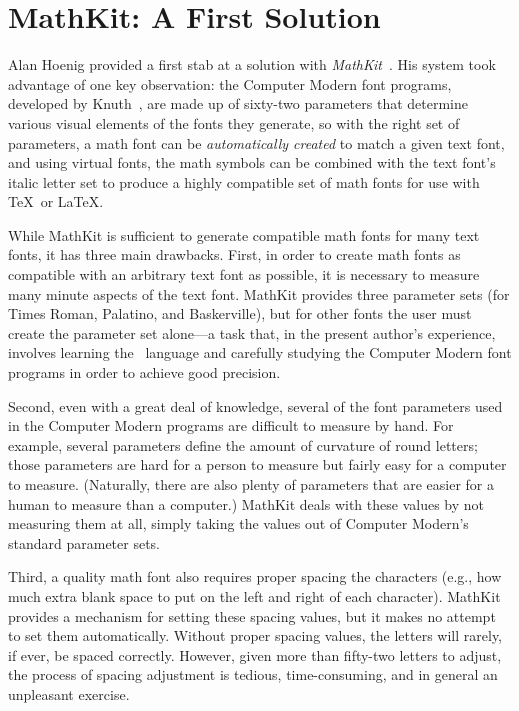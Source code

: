 \documentclass[preprint]{ltugproc}
\begin{document}
\section{MathKit: A First Solution}

Alan Hoenig provided a first stab at a solution with
\emph{MathKit}~\cite{mathkit}. His system took advantage of one key observation:
the Computer Modern font programs, developed by Knuth~\cite{cte}, are
made up of sixty-two parameters that determine various visual elements of the
fonts they generate, so with the right set of parameters, a math font can be
\emph{automatically created} to match a given text font, and using virtual
fonts, the math symbols can be combined with the text font's italic letter set
to produce a highly compatible set of math fonts for use with \TeX\ or \LaTeX.

While MathKit is sufficient to generate compatible math fonts for many text
fonts, it has three main drawbacks. First, in order to create math fonts as
compatible with an arbitrary text font as possible, it is necessary to measure
many minute aspects of the text font. MathKit provides three parameter sets (for
Times Roman, Palatino, and Baskerville), but for other fonts the user must
create the parameter set alone---a task that, in the present author's
experience, involves learning the \MF\ language and carefully studying the
Computer Modern font programs in order to achieve good precision.

Second, even with a great deal of knowledge, several of the font parameters used
in the Computer Modern programs are difficult to measure by hand. For example,
several parameters define the amount of curvature of round letters; those
parameters are hard for a person to measure but fairly easy for a computer to
measure. (Naturally, there are also plenty of parameters that are easier for a
human to measure than a computer.) MathKit deals with these values by not
measuring them at all, simply taking the values out of Computer Modern's
standard parameter sets.

Third, a quality math font also requires proper spacing the characters (e.g.,
how much extra blank space to put on the left and right of each character).
MathKit provides a mechanism for setting these spacing values, but it makes no
attempt to set them automatically. Without proper spacing values, the letters
will rarely, if ever, be spaced correctly. However, given more than fifty-two
letters to adjust, the process of spacing adjustment is tedious, time-consuming,
and in general an unpleasant exercise.
\end{document}
